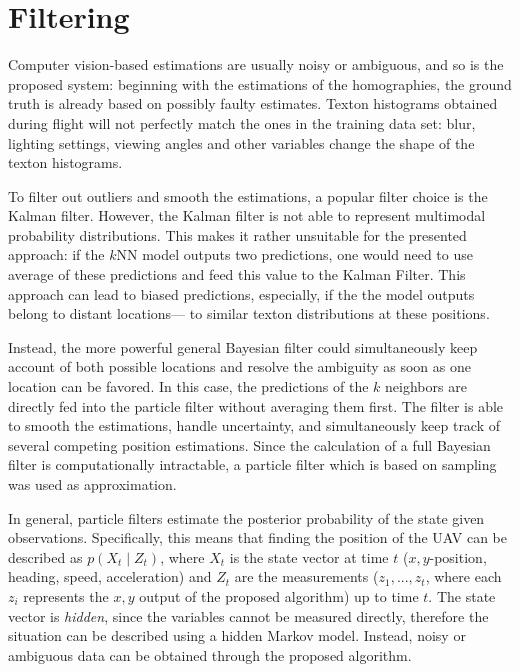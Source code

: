 \documentclass{report}
\begin{document}
\section{Filtering}
\label{sec:filtering}


Computer vision-based estimations are usually noisy or ambiguous, and
so is the proposed system: beginning with the estimations of the
homographies, the ground truth is already based on possibly faulty
estimates. Texton histograms obtained during flight will not perfectly
match the ones in the training data set: blur, lighting settings,
viewing angles and other variables change the shape of the texton
histograms.

To filter out outliers and smooth the estimations, a popular filter
choice is the Kalman filter. However, the Kalman filter is not able to
represent multimodal probability distributions. This makes it rather
unsuitable for the presented approach: if the $k$NN model outputs two
predictions, one would need to use average of these predictions and
feed this value to the Kalman Filter. This approach can lead to biased
predictions, especially, if the the model outputs belong to distant
locations--- to similar texton distributions at these positions.

Instead, the more powerful general Bayesian filter could
simultaneously keep account of both possible locations and resolve the
ambiguity as soon as one location can be favored. In this case, the
predictions of the $k$ neighbors are directly fed into the particle
filter without averaging them first. The filter is able to smooth the
estimations, handle uncertainty, and simultaneously keep track of
several competing position estimations. Since the calculation of a
full Bayesian filter is computationally intractable, a particle filter
which is based on sampling was used as approximation.

In general, particle filters estimate the posterior probability of the
state given observations. Specifically, this means that finding the
position of the UAV can be described as $p(X_t \mid Z_t)$, where $X_t$
is the state vector at time $t$ ($x,y$-position, heading, speed,
acceleration) and $Z_t$ are the measurements ($z_1, ..., z_t$, where
each $z_i$ represents the $x,y$ output of the proposed algorithm) up
to time $t$. The state vector is \emph{hidden}, since the variables
cannot be measured directly, therefore the situation can be described
using a hidden Markov model. Instead, noisy or ambiguous data can be
obtained through the proposed algorithm.
\end{document}
